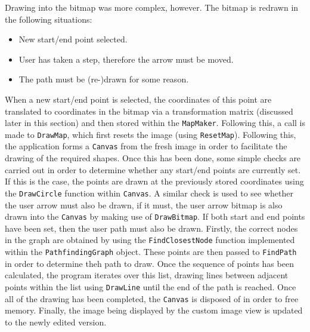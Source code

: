 \documentclass[main.tex]{subfiles}
\begin{document}
                    Drawing into the bitmap was more complex, however. The bitmap is redrawn in the following situations:
                    \begin{itemize}
                        \item New start/end point selected.
                        \item User has taken a step, therefore the arrow must be moved.
                        \item The path must be (re-)drawn for some reason.
                    \end{itemize}
                    When a new start/end point is selected, the coordinates of this point are translated to coordinates in the bitmap via a transformation matrix
                    (discussed later in this section) and then stored within the \texttt{MapMaker}. Following this, a call is made to \texttt{DrawMap}, which first resets the
                    image (using \texttt{ResetMap}). Following this, the application forms a \texttt{Canvas} from the fresh image in order to facilitate the drawing of the
                    required shapes. Once this has been done, some simple checks are carried out in order to determine whether any start/end points are currently set.
                    If this is the case, the points are drawn at the previously stored coordinates using the \texttt{DrawCircle} function within \texttt{Canvas}. A similar check
                    is used to see whether the user arrow must also be drawn, if it must, the user arrow bitmap is also drawn into the \texttt{Canvas} by making use of
                    \texttt{DrawBitmap}. If both start and end points have been set, then the user path must also be drawn. Firstly, the correct nodes in the graph are obtained
                    by using the \texttt{FindClosestNode} function implemented within the \texttt{PathfindingGraph} object. These points are then passed to
                    \texttt{FindPath} in order to determine theh path to draw. Once the sequence of points has been calculated, the program iterates over this list, drawing lines
                    between adjacent points within the list using \texttt{DrawLine} until the end of the path is reached. Once all of the drawing has been completed, the
                    \texttt{Canvas} is disposed of in order to free memory. Finally, the image being displayed by the custom image view is updated to the newly edited
                    version.
                    
\end{document}
